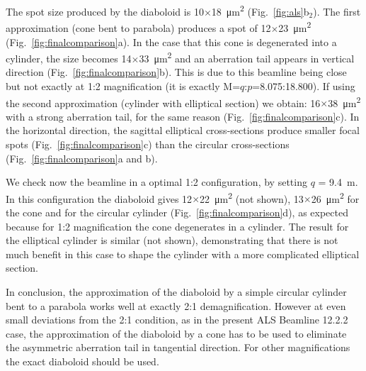 \documentclass{iucr}       %
\begin{document}
The spot size produced by the diaboloid is 10$\times$\SI{18}{\micro\meter^2} (Fig.~\ref{fig:als}b$_2$). The first approximation (cone bent to parabola) produces a spot of 12$\times$\SI{23}{\micro\meter^2} (Fig.~\ref{fig:finalcomparison}a). In the case that this cone is degenerated into a cylinder, the size becomes 14$\times$\SI{33}{\micro\meter^2} and an aberration tail appears in vertical direction (Fig.~\ref{fig:finalcomparison}b). This is due to this beamline being close but not exactly at 1:2 magnification (it is exactly M=$q$:$p$=8.075:18.800). If using the second approximation (cylinder with elliptical section) we obtain: 16$\times$\SI{38}{\micro\meter^2} with a strong aberration tail, for the same reason (Fig.~\ref{fig:finalcomparison}c). In the horizontal direction, the sagittal elliptical cross-sections produce smaller focal spots (Fig.~\ref{fig:finalcomparison}c) than the circular cross-sections (Fig.~\ref{fig:finalcomparison}a and b).

We check now the beamline in a optimal 1:2 configuration, by setting $q$ = \SI{9.4}{\meter}. In this configuration the diaboloid gives 12$\times$\SI{22}{\micro\meter^2} (not shown), 13$\times$\SI{26}{\micro\meter^2} for the cone and for the circular cylinder (Fig.~\ref{fig:finalcomparison}d), as expected because for 1:2 magnification the cone degenerates in a cylinder. The result for the elliptical cylinder is similar (not shown), demonstrating that there is not much benefit in this case to shape the cylinder with a more complicated elliptical section.  

In conclusion, the approximation of the diaboloid by a simple circular cylinder bent to a parabola works well at exactly 2:1 demagnification. However at even small deviations from the 2:1 condition, as in the present ALS Beamline 12.2.2 case, the approximation of the diaboloid by a cone has to be used to eliminate the asymmetric aberration tail in tangential direction. For other magnifications the exact diaboloid should be used.
\end{document}
